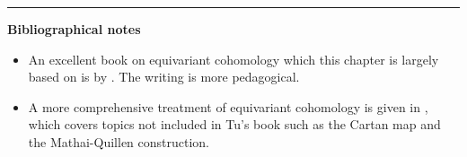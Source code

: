\begin{comment} %
\section{Equivariant characteristic classes}
\begin{defn} %
	Let $\pi: E\to M$ be a fibre bundle and let $G$ be a Lie group. We say $E$
	is a \underline{$G$-equivariant bundle} if $E$ and  $M$ are 
	$G$-manifolds  with $g \cdot \pi = \pi \cdot g$ for all  $g\in G$.\\
	If  $E$ is a vector bundle, we further require that the action  $g: E_x \to
	E_{gx}$ is linear.
\end{defn}

\begin{prop} %
	Let $f:M\to N$ be a $G$-equivariant map of  $G$-spaces, and let
	$f_G:M_G\to N_G$ be defined by $[e,x]\mapsto [e,f(x)]$. 
	\begin{enumerate}[(i)]
	    \item If $f$ is injective, then $f_G$ is injective
		\item If $f$ is surjective, then $f_G$ is surjective
		\item If $M\xrightarrow{f} N$ is a fiber bundle with fiber $F$, then
			$M_G\xrightarrow{f_G}N_G$ is a fiber bundle with fiber  $F$. 	
	\end{enumerate}
\end{prop}

Let $G$ be a topological group, and  $\pi : E\to M$ be a  $G$-equivariant vector
bundle. By the proposition above, this induces a vector bundle  $\pi_G : E_G\to
M_G$ on homotopy quotients of the same rank. If $E\to M$ is oriented, then so is
$E_G \to M_G$. 

The \underline{equivariant Euler class} of an oriented equivariant vector bundle
$\pi : E \to M$ is defined to be the Euler class of $\pi_G : E_G \to M_G$, i.e.
it is an element of $H_G^*(M)$. 
\end{comment}

\vspace{5mm}
\hrule 
\vspace{5mm}

\textbf{Bibliographical notes}
{\small
\begin{itemize}
	\item An excellent book on equivariant cohomology which this chapter is
	largely based on is  by
	\citet{equivariant_tu}. The writing is more pedagogical. 
	\item A more comprehensive treatment of equivariant cohomology is given in
	\citet{guillemin}, which covers topics not included in Tu's book such as 
	the Cartan map and the Mathai-Quillen construction. 
\end{itemize}
}


